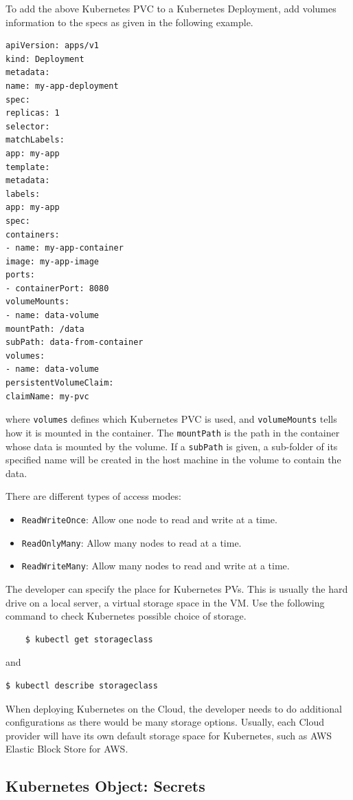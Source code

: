To add the above Kubernetes PVC to a Kubernetes Deployment, add volumes information to the specs as given in the following example.
\begin{lstlisting}
apiVersion: apps/v1
kind: Deployment
metadata:
name: my-app-deployment
spec:
replicas: 1
selector:
matchLabels:
app: my-app
template:
metadata:
labels:
app: my-app
spec:
containers:
- name: my-app-container
image: my-app-image
ports:
- containerPort: 8080
volumeMounts:
- name: data-volume
mountPath: /data
subPath: data-from-container
volumes:
- name: data-volume
persistentVolumeClaim:
claimName: my-pvc
\end{lstlisting}
where \verb|volumes| defines which Kubernetes PVC is used, and \verb|volumeMounts| tells how it is mounted in the container. The \verb|mountPath| is the path in the container whose data is mounted by the volume. If a \verb|subPath| is given, a sub-folder of its specified name will be created in the host machine in the volume to contain the data.

There are different types of access modes:
\begin{itemize}
	\item \verb|ReadWriteOnce|: Allow one node to read and write at a time.
	\item \verb|ReadOnlyMany|: Allow many nodes to read at a time.
	\item \verb|ReadWriteMany|: Allow many nodes to read and write at a time.
\end{itemize}

The developer can specify the place for Kubernetes PVs. This is usually the hard drive on a local server, a virtual storage space in the VM. Use the following command to check Kubernetes possible choice of storage.
\begin{lstlisting}
	$ kubectl get storageclass
\end{lstlisting}
and
\begin{lstlisting}
$ kubectl describe storageclass
\end{lstlisting}
When deploying Kubernetes on the Cloud, the developer needs to do additional configurations as there would be many storage options. Usually, each Cloud provider will have its own default storage space for Kubernetes, such as AWS Elastic Block Store for AWS.

\subsection{Kubernetes Object: Secrets} \label{ch:vac:subsec:k8ssecrets}

